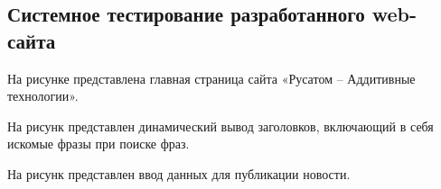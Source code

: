 \subsection{Системное тестирование разработанного web-сайта}

На рисунке  представлена главная страница сайта «Русатом – Аддитивные технологии».
\newpage %


На рисунк представлен динамический вывод заголовков, включающий в себя искомые фразы при поиске фраз.


На рисунк представлен ввод данных для публикации новости.

